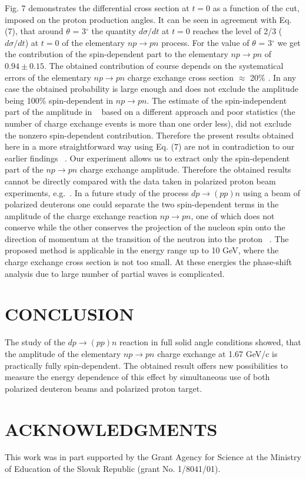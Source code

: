  Fig. 7 demonstrates the differential cross section at $t=0$ as a
 function of the cut, imposed
on the proton production angles. It can be seen in agreement with
Eq. (7), that around
$\theta$ = 3$^\circ$
the quantity $d\sigma/dt$ at $t=0$ reaches the level of
2/3 ($d\sigma/dt$) at $t=0$ of the elementary $np\to pn$ process.
For the value of $\theta$ = 3$^\circ$ we get the contribution of the
spin-dependent part to the elementary $np\to pn$ of $0.94  \pm  0.15$. The obtained
contribution of course depends on the systematical errors
of the elementary $np\to pn$ charge exchange cross section $\approx$
20\% \cite{She}.
In any case the obtained probability is large enough and does not exclude
the amplitude being 100\% spin-dependent in $np\to pn$.
The estimate of the spin-independent part of the
amplitude in ~\cite{Ala} based on a different approach and poor statistics
(the number of charge exchange events is more than one order less),
did not exclude the nonzero spin-dependent contribution. Therefore
the present results obtained here in a more straightforward way using
Eq. (7) are not in contradiction to our earlier findings ~\cite{Ala}.
Our experiment allows us to extract only the spin-dependent part of the
$np\to pn$ charge exchange amplitude. Therefore the obtained results
cannot be directly compared with the data taken in polarized proton
beam experiments, e.g.~\cite{Rans}. In a future study of the
 process $dp\to (pp)n$ using
a beam of polarized deuterons one could
separate the two spin-dependent terms in the amplitude of the charge exchange
reaction $np\to pn$, one of which does not conserve while  the other
conserves the projection of the nucleon spin onto the direction of
momentum at the transition of the neutron into the proton ~\cite{Gla}.
The proposed method is applicable in the energy range up to 10 GeV, where
the charge exchange cross section is not too small. At these energies
the phase-shift analysis due to large number of partial waves is complicated.
\section{CONCLUSION}
\indent
The study of the $dp\to (pp)n$ reaction in full solid angle conditions
showed, that the amplitude of the elementary $np\to pn$ charge exchange
at 1.67 GeV/c is practically  fully spin-dependent.
The obtained result offers new possibilities to measure
the energy dependence of this effect by simultaneous use of both  polarized
deuteron beams and polarized proton target.
\noindent
\section{ACKNOWLEDGMENTS}
\indent
This work was in part supported by the Grant Agency for Science at
the Ministry of Education of the Slovak Republic (grant No. 1/8041/01).


